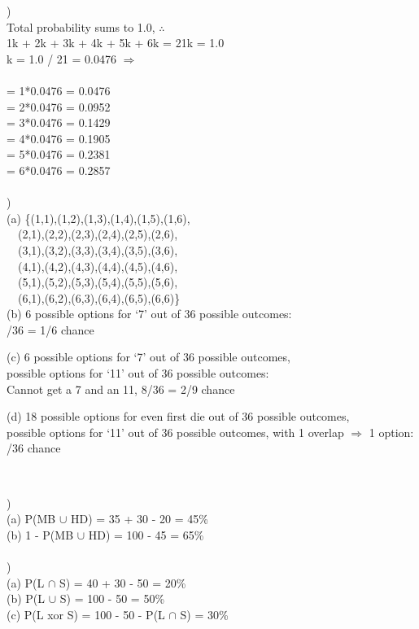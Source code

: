 \documentclass[12pt]{article}
\begin{document}
)\\
\indent \indent Total probability sums to 1.0, $\therefore$\\
\indent \indent 1k + 2k + 3k + 4k + 5k + 6k = 21k = 1.0\\
\indent \indent k = 1.0 / 21 = 0.0476 $\Rightarrow$\\\\
\indent \indent [1] = 1*0.0476 = 0.0476\\
\indent \indent [2] = 2*0.0476 = 0.0952\\
\indent \indent [3] = 3*0.0476 = 0.1429\\
\indent \indent [4] = 4*0.0476 = 0.1905\\
\indent \indent [5] = 5*0.0476 = 0.2381\\
\indent \indent [6] = 6*0.0476 = 0.2857\\


\hrulefill \\


)\\
\indent (a) \{(1,1),(1,2),(1,3),(1,4),(1,5),(1,6),\\
\indent \indent \  \ (2,1),(2,2),(2,3),(2,4),(2,5),(2,6),\\
\indent \indent \  \ (3,1),(3,2),(3,3),(3,4),(3,5),(3,6),\\
\indent \indent \  \ (4,1),(4,2),(4,3),(4,4),(4,5),(4,6),\\
\indent \indent \  \ (5,1),(5,2),(5,3),(5,4),(5,5),(5,6),\\
\indent \indent \  \ (6,1),(6,2),(6,3),(6,4),(6,5),(6,6)\}\\

(b) 6 possible options for `7' out of 36 possible outcomes:\\
\indent {}/36 = 1/6 chance

(c) 6 possible options for `7' out of 36 possible outcomes,\\
\indent {} possible options for `11' out of 36 possible outcomes:\\
\indent \indent Cannot get a 7 and an 11, 8/36 = 2/9 chance

(d) 18 possible options for even first die out of 36 possible outcomes,\\
\indent {} possible options for `11' out of 36 possible outcomes, with 1 overlap $\Rightarrow$ 1 option:\\
\indent {}/36 chance


\hrulefill \\
\pagebreak


)\\
\indent (a) P(MB $\cup$ HD) = 35 + 30 - 20 = 45\%\\

(b) 1 - P(MB $\cup$ HD) = 100 - 45 = 65\%\\


\hrulefill \\


)\\
\indent (a) P(L $\cap$ S) = 40 + 30 - 50 = 20\%\\

(b)  P(L $\cup$ S) = 100 - 50 = 50\%\\

(c) P(L xor S) = 100 - 50 -  P(L $\cap$ S) = 30\%
\end{document}
